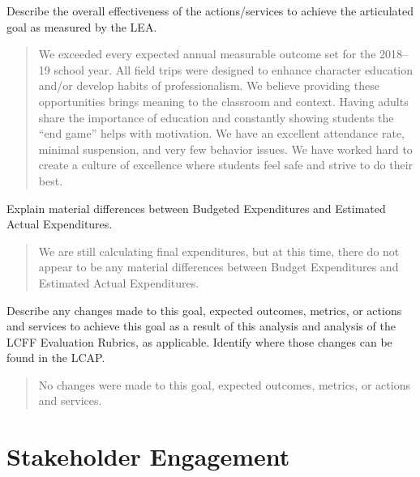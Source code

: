 \documentclass{article}
\newcounter{goal}[section]
\newcounter{action}[goal]
\begin{document}
Describe the overall effectiveness of the actions/services to achieve the articulated goal as measured by the LEA.
\begin{quote}
	We exceeded every expected annual measurable outcome set for the 2018--19 school year. All field trips were designed to enhance character education and/or develop habits of professionalism. We believe providing these opportunities brings meaning to the classroom and context. Having adults share the importance of education and constantly showing students the ``end game'' helps with motivation. We have an excellent attendance rate, minimal suspension, and very few behavior issues. We have worked hard to create a culture of excellence where students feel safe and strive to do their best.
\end{quote}

Explain material differences between Budgeted Expenditures and Estimated Actual Expenditures.
\begin{quote}
	We are still calculating final expenditures, but at this time, there do not appear to be any material differences between Budget Expenditures and Estimated Actual Expenditures.
\end{quote}

Describe any changes made to this goal, expected outcomes, metrics, or actions and services to achieve this goal as a result of this analysis and analysis of the LCFF Evaluation Rubrics, as applicable. Identify where those changes can be found in the LCAP.
\begin{quote}
	No changes were made to this goal, expected outcomes, metrics, or actions and services.
\end{quote}

\section{Stakeholder Engagement}
\end{document}
